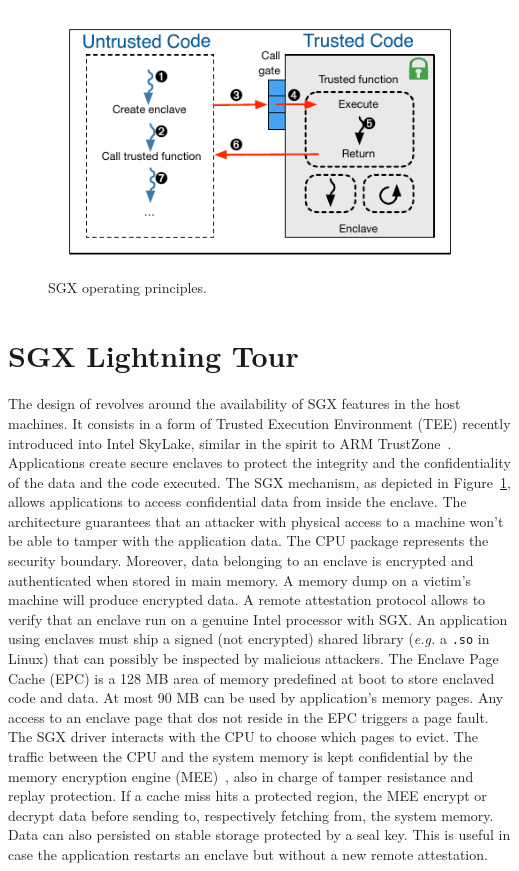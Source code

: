 \begin{figure}[!t]
  \centering
  \includegraphics[scale=0.8]{images/sgx.pdf}
  \caption{SGX operating principles.}
  \label{fig:sgx}
\end{figure}

\section{SGX Lightning Tour}
\label{sec:background}
The design of \SYS revolves around the availability of SGX features in the host machines. 
It consists in a form of Trusted Execution Environment (TEE) recently introduced into Intel SkyLake, similar in the spirit to ARM TrustZone~\cite{arm2009security}. 
Applications create secure enclaves to protect the integrity and the confidentiality of the data and the code executed. 
The SGX mechanism, as depicted in Figure~\ref{fig:sgx}, allows applications to access confidential data from inside the enclave. 
The architecture guarantees that an attacker with physical access to a machine won’t be able to tamper with the application data. 
The CPU package represents the security boundary. 
Moreover, data belonging to an enclave is encrypted and authenticated when stored in main memory. 
A memory dump on a victim’s machine will produce encrypted data. 
A remote attestation protocol allows to verify that an enclave run on a genuine Intel processor with SGX. 
An application using enclaves must ship a signed (not encrypted) shared library (\emph{e.g.} a \texttt{.so} in Linux) that can possibly be inspected by malicious attackers. 
The Enclave Page Cache (EPC) is a 128 MB area of memory predefined at boot to store enclaved code and data. 
At most 90 MB can be used by application’s memory pages. 
Any access to an enclave page that dos not reside in the EPC triggers a page fault. 
The SGX driver interacts with the CPU to choose which pages to evict. 
The traffic between the CPU and the system memory is kept confidential by the memory encryption engine (MEE)~\cite{gueron2016memory}, also in charge of tamper resistance and replay protection. 
If a cache miss hits a protected region, the MEE encrypt or decrypt data before sending to, respectively fetching from, the system memory. 
Data can also persisted on stable storage protected by a seal key. 
This is useful in case the application restarts an enclave but without a new remote attestation.

